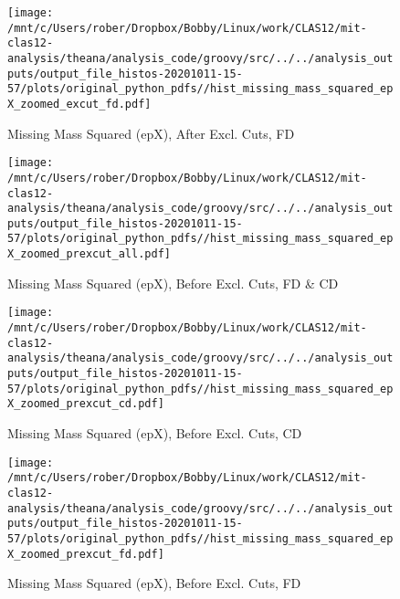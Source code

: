 \documentclass{article}
\begin{document}
\begin{landscape}
    \begin{figure}[h]
        \centering

        \texttt{[image: /mnt/c/Users/rober/Dropbox/Bobby/Linux/work/CLAS12/mit-clas12-analysis/theana/analysis\_code/groovy/src/../../analysis\_outputs/output\_file\_histos-20201011-15-57/plots/original\_python\_pdfs//hist\_missing\_mass\_squared\_epX\_zoomed\_excut\_fd.pdf]}
        \captionsetup{textformat=empty,labelformat=blank}
        \caption{Missing Mass Squared (epX), After Excl. Cuts, FD}
    \end{figure}
    \clearpage
    
    \begin{figure}[h]
        \centering

        \texttt{[image: /mnt/c/Users/rober/Dropbox/Bobby/Linux/work/CLAS12/mit-clas12-analysis/theana/analysis\_code/groovy/src/../../analysis\_outputs/output\_file\_histos-20201011-15-57/plots/original\_python\_pdfs//hist\_missing\_mass\_squared\_epX\_zoomed\_prexcut\_all.pdf]}
        \captionsetup{textformat=empty,labelformat=blank}
        \caption{Missing Mass Squared (epX), Before Excl. Cuts, FD \& CD}
    \end{figure}
    \clearpage
    
    \begin{figure}[h]
        \centering

        \texttt{[image: /mnt/c/Users/rober/Dropbox/Bobby/Linux/work/CLAS12/mit-clas12-analysis/theana/analysis\_code/groovy/src/../../analysis\_outputs/output\_file\_histos-20201011-15-57/plots/original\_python\_pdfs//hist\_missing\_mass\_squared\_epX\_zoomed\_prexcut\_cd.pdf]}
        \captionsetup{textformat=empty,labelformat=blank}
        \caption{Missing Mass Squared (epX), Before Excl. Cuts, CD}
    \end{figure}
    \clearpage
    
    \begin{figure}[h]
        \centering

        \texttt{[image: /mnt/c/Users/rober/Dropbox/Bobby/Linux/work/CLAS12/mit-clas12-analysis/theana/analysis\_code/groovy/src/../../analysis\_outputs/output\_file\_histos-20201011-15-57/plots/original\_python\_pdfs//hist\_missing\_mass\_squared\_epX\_zoomed\_prexcut\_fd.pdf]}
        \captionsetup{textformat=empty,labelformat=blank}
        \caption{Missing Mass Squared (epX), Before Excl. Cuts, FD}
    \end{figure}
    \clearpage
    
    \begin{figure}[h]
        \centering


\end{figure}
\end{landscape}
\end{document}
